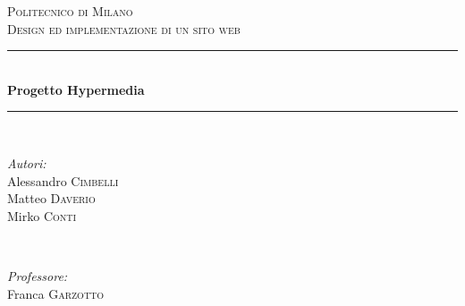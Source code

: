 \documentclass{article}
\begin{document}
	
	
	\begin{titlepage}
		
		\newcommand{\HRule}{\rule{\linewidth}{0.5mm}} %
		
		\center %
		
		
		\textsc{\LARGE Politecnico di Milano}\\[1.5cm] %
		\textsc{\Large Design ed implementazione di un sito web}\\[0.5cm] %
		
		
		\HRule \\[0.4cm]
		{ \huge \bfseries Progetto Hypermedia}\\[0.4cm] %
		\HRule \\[1.5cm]
		
		
		\begin{minipage}{0.4\textwidth}
			\begin{flushleft} \large
				\emph{Autori:}\\
				Alessandro \textsc{Cimbelli} %
				\\
				Matteo \textsc{Daverio} %
				\\
				Mirko \textsc{Conti} %
			\end{flushleft}
		\end{minipage}
		~
		\begin{minipage}{0.4\textwidth}
			\begin{flushright} \large
				\emph{Professore:} \\
				Franca \textsc{Garzotto} %
			\end{flushright}
		\end{minipage}\\[2cm]
		

\end{titlepage}
\end{document}
